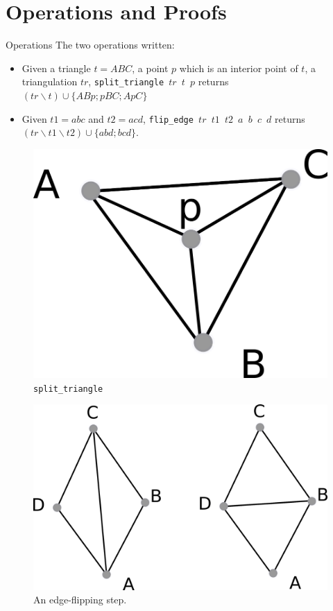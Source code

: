 \documentclass[18pt]{beamer}
\begin{document}
\section{Operations and Proofs}

\begin{frame}{Operations}
The two operations written:
 \begin{itemize}
  \item<1-> Given a triangle $t = ABC$, a point $p$ which is an interior point of $t$, a triangulation $tr$, {\tt split\_triangle $tr$ $t$ $p$} returns $(tr \smallsetminus t) \cup \{ABp;pBC;ApC\}$
  \item<2-> Given $t1 = abc$ and $t2=acd$, {\tt flip\_edge $tr$ $t1$ $t2$ $a$ $b$ $c$ $d$} returns $(tr \smallsetminus t1 \smallsetminus t2) \cup \{abd;bcd\}$.
 \end{itemize}
\begin{overprint}
 \begin{figure}
  \centering
  \includegraphics[scale=1.2]{split_triangle}
    \caption{{\tt split\_triangle}}
\end{figure}
 \begin{figure}
  \centering
  \includegraphics[scale=0.8]{flip_edge}
    \caption{\label{flip_edge} An edge-flipping step.}
\end{figure}

\end{overprint}

\end{frame}
\end{document}
